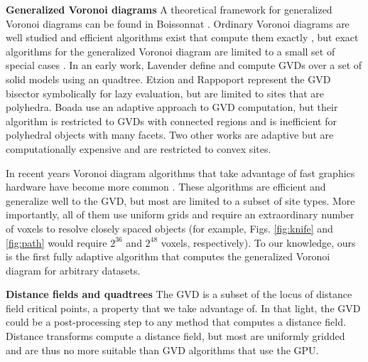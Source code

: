 \documentclass{egpubl}
\renewcommand{\paragraph}[1]{\noindent \textbf{#1}}
\begin{document}
\paragraph{Generalized Voronoi diagrams}
A theoretical framework for generalized Voronoi diagrams can be found in Boissonnat \etal {}. Ordinary Voronoi diagrams are well studied and efficient algorithms exist that compute them exactly \cite{de2008computational}, but exact algorithms for the generalized Voronoi diagram are limited to a small set of special cases \cite{lee1982medial,karavelas2004robust}. In an early work, Lavender \etal {} define and compute GVDs over a set of solid models using an quadtree.  Etzion and Rappoport  represent the GVD bisector symbolically for lazy evaluation, but are limited to sites that are polyhedra.  Boada \etal {} use an adaptive approach to GVD computation, but their algorithm is restricted to GVDs with connected regions and is inefficient for polyhedral objects with many facets.  Two other works are adaptive \cite{teichmann1997polygonal,vleugels1998approximating} but are computationally expensive and are restricted to convex sites.

In recent years Voronoi diagram algorithms that take advantage of fast graphics hardware have become more common \cite{cao2010parallel,fischer2006fast,hsieh2005simple,rong2007variants,sud2006interactive,sud2006fast,hoff1999fast,wu2008gpu}.  These algorithms are efficient and generalize well to the GVD, but most are limited to a subset of site types.  More importantly, all of them use uniform grids and require an extraordinary number of voxels to resolve closely spaced objects (for example, Figs. \ref{fig:knife} and \ref{fig:path} would require $2^{36}$ and $2^{48}$ voxels, respectively).  To our knowledge, ours is the first fully adaptive algorithm that computes the generalized Voronoi diagram for arbitrary datasets.

\paragraph{Distance fields and quadtrees}
The GVD is a subset of the locus of distance field critical points, a property that we take advantage of. In that light, the GVD could be a post-processing step to any method that computes a distance field.  Distance transforms compute a distance field, but most are uniformly gridded \cite{jones20063d} and are thus no more suitable than GVD algorithms that use the GPU.
\end{document}
